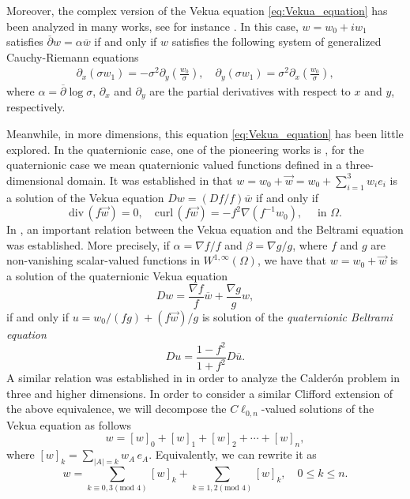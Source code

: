 \documentclass[12pt]{article}
\newcommand{\comment}[1]{\marginpar{\hfuzz=5ex
\scriptsize$\stackrel{?}{\longleftarrow}$\\\hspace*{-3ex}
{\fbox{\parbox{20ex}{\hfuzz=15ex \raggedright\sf#1 }}} }}
\def\div{\mbox{div}\,}
\def\curl{\mbox{curl}\,}
\def\D{\mathbb{D}}
\begin{document}
Moreover, the complex version of the Vekua equation \eqref{eq:Vekua_equation} 
 has been analyzed in many works, see for instance \cite{BLRR2010, BFL2011, Fischer-1, Fischer-2, Campos2020, DelLeb2020}. In this case, $w=w_0+iw_1$ satisfies $\overline{\partial}w=\alpha \overline{w}$ if and only if $w$ satisfies the following system of generalized Cauchy-Riemann equations
\begin{align*} %
   \nonumber \partial_x(\sigma w_1)=-\sigma^2 \partial_y \left(\frac{w_0}{\sigma}\right),   \quad
	  \partial_y(\sigma w_1)=\sigma^2 \partial_x\left(\frac{w_0}{\sigma}\right),
\end{align*}
where $\alpha=\overline{\partial}\log \sigma$, $\partial_x$ and $\partial_y$ are the partial derivatives with respect to $x$ and $y$, respectively.

Meanwhile, in more dimensions, this equation \eqref{eq:Vekua_equation} has been little explored. In the quaternionic case, one of the pioneering works is \cite[Ch.\ 16]{Krav2009}, for the quaternionic case we mean quaternionic valued functions defined in a three-dimensional domain. It was established in  \cite{Krav2009} that $w=w_0+\vec w=w_0+\sum_{i=1}^3 w_i e_i$ is a solution of the Vekua equation $Dw=(Df/f)\overline{w}$ if and only if
\[
 \div (f\vec w)=0, \quad 
 \curl( f\vec w)=-f^2 \nabla\left(f^{-1}w_0\right), \quad \text{ in }\Omega.
\]
In \cite{DelPor2019}, an important relation between the Vekua equation and the Beltrami equation was established. More precisely, if $\alpha=\nabla f/f$ and $\beta=\nabla g/g$, where $f$ and $g$ are non-vanishing scalar-valued functions in $W^{1,\infty}(\Omega)$, we have that $w=w_0+\vec w$ is a solution of the quaternionic Vekua equation 
\begin{equation}\label{eq:Vekua-quaternionic}
  Dw=\dfrac{\nabla f}{f} \overline{w}+\dfrac{\nabla g}{g}w,
\end{equation}
if and only if $u=w_0/(fg)+(f\vec w)/g$ is solution of the \textit{quaternionic Beltrami equation} \cite{DelPor2019}
\begin{equation}\label{eq:Beltrami-equation}
   Du=\dfrac{1-f^2}{1+f^2} D\overline{u}.
\end{equation}
A similar relation was established in \cite{Santa2019} in order to analyze the Calderón problem in three and higher dimensions. In order to consider a similar Clifford extension of the above equivalence, we will decompose the $C\ell_{0,n}$-valued solutions of the Vekua equation as follows
\[
w=[w]_0+[w]_1+[w]_2+\cdots+[w]_n,
\]
where $[w]_k=\sum_{|A|=k} w_A\, e_A$. Equivalently, we can rewrite it as 
\[
w=\sum_{k\equiv 0,3 (\text{mod } 4)} [w]_k+\sum_{k\equiv 1,2 (\text{mod } 4)} [w]_k, \quad 0\leq k\leq n.
\]
\end{document}

